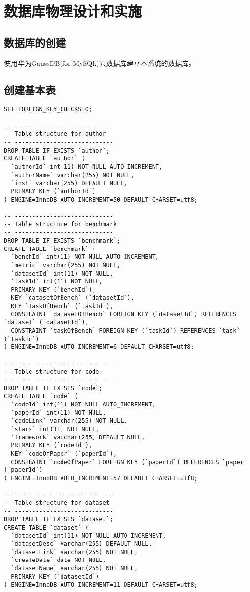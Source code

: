 \chapter{数据库物理设计和实施}

\section{数据库的创建}

使用华为GaussDB(for MySQL)云数据库建立本系统的数据库。

\section{创建基本表}

\scriptsize
\begin{verbatim}
SET FOREIGN_KEY_CHECKS=0;

-- ----------------------------
-- Table structure for author
-- ----------------------------
DROP TABLE IF EXISTS `author`;
CREATE TABLE `author` (
  `authorId` int(11) NOT NULL AUTO_INCREMENT,
  `authorName` varchar(255) NOT NULL,
  `inst` varchar(255) DEFAULT NULL,
  PRIMARY KEY (`authorId`)
) ENGINE=InnoDB AUTO_INCREMENT=50 DEFAULT CHARSET=utf8;

-- ----------------------------
-- Table structure for benchmark
-- ----------------------------
DROP TABLE IF EXISTS `benchmark`;
CREATE TABLE `benchmark` (
  `benchId` int(11) NOT NULL AUTO_INCREMENT,
  `metric` varchar(255) NOT NULL,
  `datasetId` int(11) NOT NULL,
  `taskId` int(11) NOT NULL,
  PRIMARY KEY (`benchId`),
  KEY `datasetOfBench` (`datasetId`),
  KEY `taskOfBench` (`taskId`),
  CONSTRAINT `datasetOfBench` FOREIGN KEY (`datasetId`) REFERENCES `dataset` (`datasetId`),
  CONSTRAINT `taskOfBench` FOREIGN KEY (`taskId`) REFERENCES `task` (`taskId`)
) ENGINE=InnoDB AUTO_INCREMENT=6 DEFAULT CHARSET=utf8;

-- ----------------------------
-- Table structure for code
-- ----------------------------
DROP TABLE IF EXISTS `code`;
CREATE TABLE `code` (
  `codeId` int(11) NOT NULL AUTO_INCREMENT,
  `paperId` int(11) NOT NULL,
  `codeLink` varchar(255) NOT NULL,
  `stars` int(11) NOT NULL,
  `framework` varchar(255) DEFAULT NULL,
  PRIMARY KEY (`codeId`),
  KEY `codeOfPaper` (`paperId`),
  CONSTRAINT `codeOfPaper` FOREIGN KEY (`paperId`) REFERENCES `paper` (`paperId`)
) ENGINE=InnoDB AUTO_INCREMENT=57 DEFAULT CHARSET=utf8;

-- ----------------------------
-- Table structure for dataset
-- ----------------------------
DROP TABLE IF EXISTS `dataset`;
CREATE TABLE `dataset` (
  `datasetId` int(11) NOT NULL AUTO_INCREMENT,
  `datasetDesc` varchar(255) DEFAULT NULL,
  `datasetLink` varchar(255) NOT NULL,
  `createDate` date NOT NULL,
  `datasetName` varchar(255) NOT NULL,
  PRIMARY KEY (`datasetId`)
) ENGINE=InnoDB AUTO_INCREMENT=11 DEFAULT CHARSET=utf8;


\end{verbatim}
